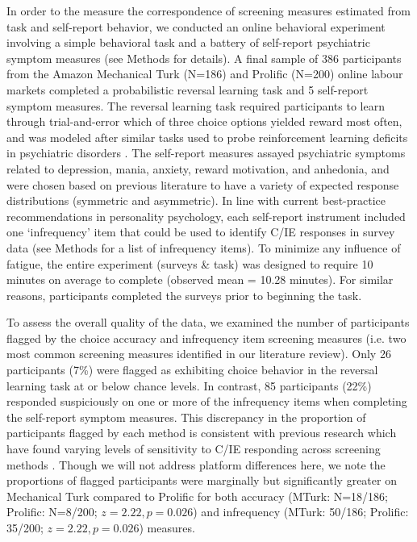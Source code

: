 \documentclass[a4paper,notitlepage,12pt]{article}
\begin{document}
In order to the measure the correspondence of screening measures estimated from task and self-report behavior, we conducted an online behavioral experiment involving a simple behavioral task and a battery of self-report psychiatric symptom measures (see Methods for details). A final sample of 386 participants from the Amazon Mechanical Turk (N=186) and Prolific (N=200) online labour markets completed a probabilistic reversal learning task and 5 self-report symptom measures. The reversal learning task required participants to learn through trial-and-error which of three choice options yielded reward most often, and was modeled after similar tasks used to probe reinforcement learning deficits in psychiatric disorders \cite{huang2017computational, waltz2007probabilistic, mukherjee_reward_2020}. The self-report measures assayed psychiatric symptoms related to depression, mania, anxiety, reward motivation, and anhedonia, and were chosen based on previous literature to have a variety of expected response distributions (symmetric and asymmetric). In line with current best-practice recommendations in personality psychology, each self-report instrument included one `infrequency' item that could be used to identify C/IE responses in survey data (see Methods for a list of infrequency items). To minimize any influence of fatigue, the entire experiment (surveys \& task) was designed to require 10 minutes on average to complete (observed mean = 10.28 minutes). For similar reasons, participants completed the surveys prior to beginning the task.

To assess the overall quality of the data, we examined the number of participants flagged by the choice accuracy and infrequency item screening measures (i.e. two most common screening measures identified in our literature review). Only 26 participants (7\%) were flagged as exhibiting choice behavior in the reversal learning task at or below chance levels. In contrast, 85 participants (22\%) responded suspiciously on one or more of the infrequency items when completing the self-report symptom measures. This discrepancy in the proportion of participants flagged by each method is consistent with previous research which have found varying levels of sensitivity to C/IE responding across screening methods \cite{desimone2018dirty}. Though we will not address platform differences here, we note the proportions of flagged participants were marginally but significantly greater on Mechanical Turk compared to Prolific for both accuracy (MTurk: N=18/186; Prolific: N=8/200; $z=2.22, p=0.026$) and infrequency (MTurk: 50/186; Prolific: 35/200; $z = 2.22, p = 0.026$) measures.
\end{document}
